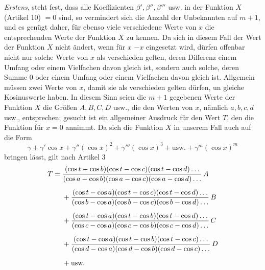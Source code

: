 \textit{Erstens}, steht fest, dass alle Koeffizienten \(\beta',\beta'',\beta'''\) usw. in der Funktion \(X\) (Artikel 10) \(=0\) sind, so vermindert sich die Anzahl der Unbekannten auf \(m+1\), und es genügt daher, für ebenso viele verschiedene Werte von \(x\) die entsprechenden Werte der Funktion \(X\) zu kennen. Da sich in diesem Fall der Wert der Funktion \(X\) nicht ändert, wenn für \(x\) \(-x\) eingesetzt wird, dürfen offenbar nicht nur solche Werte von \(x\) als verschieden gelten, deren Differenz einem Umfang oder einem Vielfachen davon gleich ist, sondern auch solche, deren Summe \(0\) oder einem Umfang oder einem Vielfachen davon gleich ist. Allgemein müssen zwei Werte von \(x\), damit sie als verschieden gelten dürfen, un%
gleiche Kosinuswerte haben. In diesem Sinn seien die \(m+1\) gegebenen Werte der Funktion \(X\) die Größen \(A, B, C, D\) usw., die den Werten von \(x\), nämlich \(a, b, c, d\) usw., entsprechen; gesucht ist ein allgemeiner Ausdruck für den Wert \(T\), den die Funktion für \(x=0\) annimmt.
Da sich die Funktion \(X\) in unserem Fall auch auf die Form
\[
\gamma+\gamma'\cos x+\gamma''(\cos x)^2+\gamma'''(\cos x)^3+\text{usw.}+\gamma^m(\cos x)^m
\]
bringen lässt, gilt nach Artikel 3
\[
\begin{aligned}
T={}&\frac{(\cos t-\cos b)(\cos t-\cos c)(\cos t-\cos d)\mathinner{.\,.\,.}}{(\cos a-\cos b)(\cos a-\cos c)(\cos a-\cos d)\mathinner{.\,.\,.}}\,A\\[5pt]
&+\frac{(\cos t-\cos a)(\cos t-\cos c)(\cos t-\cos d)\mathinner{.\,.\,.}}{(\cos b-\cos a)(\cos b-\cos c)(\cos b-\cos d)\mathinner{.\,.\,.}}\,B\\[5pt]
&+\frac{(\cos t-\cos a)(\cos t-\cos b)(\cos t-\cos d)\mathinner{.\,.\,.}}{(\cos c-\cos a)(\cos c-\cos b)(\cos c-\cos d)\mathinner{.\,.\,.}}\,C\\[5pt]
&+\frac{(\cos t-\cos a)(\cos t-\cos b)(\cos t-\cos c)\mathinner{.\,.\,.}}{(\cos d-\cos a)(\cos d-\cos b)(\cos d-\cos c)\mathinner{.\,.\,.}}\,D\\[5pt]
&+\text{usw.}
\end{aligned}
\]

